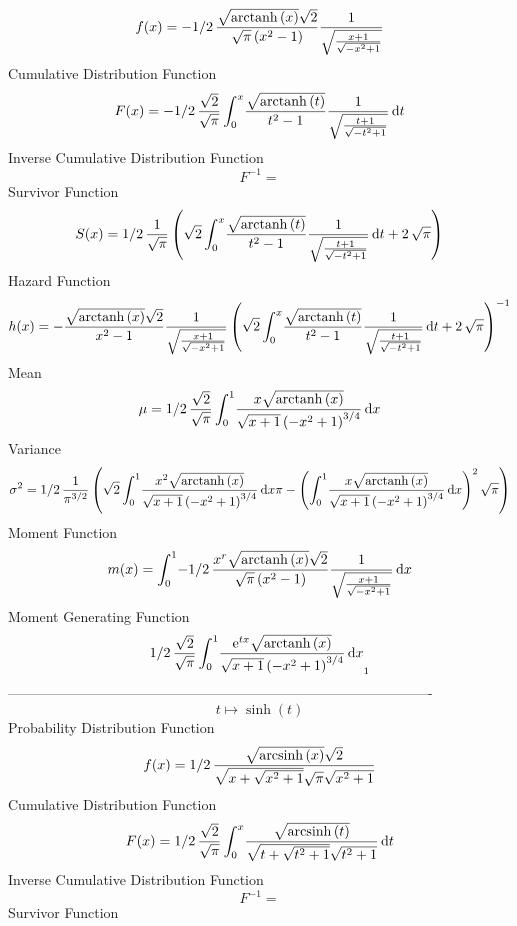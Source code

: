 \documentclass[12pt]{article}
\begin{document}
$$  f(x)=-1/2\,{\frac {\sqrt {{\rm arctanh} \left(x\right)}\sqrt {2}}{\sqrt {
\pi} \left( {x}^{2}-1 \right) }{\frac {1}{\sqrt {{\frac {x+1}{\sqrt {-
{x}^{2}+1}}}}}}}
$$Cumulative Distribution Function  
 $$F(x)=-1/2\,{\frac {\sqrt {2}}{\sqrt {\pi}}\int_{0}^{x}\!{\frac {\sqrt {
{\rm arctanh} \left(t\right)}}{{t}^{2}-1}{\frac {1}{\sqrt {{\frac {t+1
}{\sqrt {-{t}^{2}+1}}}}}}}\,{\rm d}t}
$$ Inverse Cumulative Distribution Function 
  $$F^{-1} = $$Survivor Function 
 $$ S(x)=1/2\,{\frac {1}{\sqrt {\pi}} \left( \sqrt {2}\int_{0}^{x}\!{\frac {
\sqrt {{\rm arctanh} \left(t\right)}}{{t}^{2}-1}{\frac {1}{\sqrt {{
\frac {t+1}{\sqrt {-{t}^{2}+1}}}}}}}\,{\rm d}t+2\,\sqrt {\pi} \right) 
}
$$ Hazard Function 
 $$ h(x)=-{\frac {\sqrt {{\rm arctanh} \left(x\right)}\sqrt {2}}{{x}^{2}-1}{
\frac {1}{\sqrt {{\frac {x+1}{\sqrt {-{x}^{2}+1}}}}}} \left( \sqrt {2}
\int_{0}^{x}\!{\frac {\sqrt {{\rm arctanh} \left(t\right)}}{{t}^{2}-1}
{\frac {1}{\sqrt {{\frac {t+1}{\sqrt {-{t}^{2}+1}}}}}}}\,{\rm d}t+2\,
\sqrt {\pi} \right) ^{-1}}
$$Mean 
 $$ \mu=1/2\,{\frac {\sqrt {2}}{\sqrt {\pi}}\int_{0}^{1}\!{\frac {x\sqrt {
{\rm arctanh} \left(x\right)}}{\sqrt {x+1} \left( -{x}^{2}+1 \right) ^
{3/4}}}\,{\rm d}x}
$$ Variance 
 $$ \sigma^2 = 1/2\,{\frac {1}{{\pi}^{3/2}} \left( \sqrt {2}\int_{0}^{1}\!{\frac {{x}
^{2}\sqrt {{\rm arctanh} \left(x\right)}}{\sqrt {x+1} \left( -{x}^{2}+
1 \right) ^{3/4}}}\,{\rm d}x\pi- \left( \int_{0}^{1}\!{\frac {x\sqrt {
{\rm arctanh} \left(x\right)}}{\sqrt {x+1} \left( -{x}^{2}+1 \right) ^
{3/4}}}\,{\rm d}x \right) ^{2}\sqrt {\pi} \right) }
$$Moment Function 
 $$ m(x) = \int_{0}^{1}\!-1/2\,{\frac {{x}^{r}\sqrt {{\rm arctanh} \left(x\right)
}\sqrt {2}}{\sqrt {\pi} \left( {x}^{2}-1 \right) }{\frac {1}{\sqrt {{
\frac {x+1}{\sqrt {-{x}^{2}+1}}}}}}}\,{\rm d}x
$$ Moment Generating Function 
 $$1/2\,{\frac {\sqrt {2}}{\sqrt {\pi}}\int_{0}^{1}\!{\frac {{{\rm e}^{tx
}}\sqrt {{\rm arctanh} \left(x\right)}}{\sqrt {x+1} \left( -{x}^{2}+1
 \right) ^{3/4}}}\,{\rm d}x}_{{1}}
$$-------------------------------------------------------------------------------------------  \\$$t\mapsto \sinh \left( t \right) 
$$Probability Distribution Function 
$$  f(x)=1/2\,{\frac {\sqrt {{\rm arcsinh} \left(x\right)}\sqrt {2}}{\sqrt {x+
\sqrt {{x}^{2}+1}}\sqrt {\pi}\sqrt {{x}^{2}+1}}}
$$Cumulative Distribution Function  
 $$F(x)=1/2\,{\frac {\sqrt {2}}{\sqrt {\pi}}\int_{0}^{x}\!{\frac {\sqrt {
{\rm arcsinh} \left(t\right)}}{\sqrt {t+\sqrt {{t}^{2}+1}}\sqrt {{t}^{
2}+1}}}\,{\rm d}t}
$$ Inverse Cumulative Distribution Function 
  $$F^{-1} = $$Survivor Function 
\end{document}
